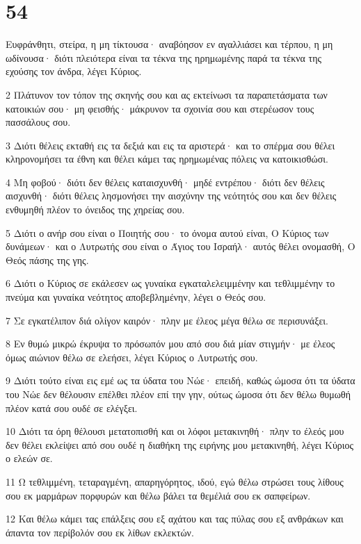 \chapter{54}

\par Ευφράνθητι, στείρα, η μη τίκτουσα· αναβόησον εν αγαλλιάσει και τέρπου, η μη ωδίνουσα· διότι πλειότερα είναι τα τέκνα της ηρημωμένης παρά τα τέκνα της εχούσης τον άνδρα, λέγει Κύριος.
\par 2 Πλάτυνον τον τόπον της σκηνής σου και ας εκτείνωσι τα παραπετάσματα των κατοικιών σου· μη φεισθής· μάκρυνον τα σχοινία σου και στερέωσον τους πασσάλους σου.
\par 3 Διότι θέλεις εκταθή εις τα δεξιά και εις τα αριστερά· και το σπέρμα σου θέλει κληρονομήσει τα έθνη και θέλει κάμει τας ηρημωμένας πόλεις να κατοικισθώσι.
\par 4 Μη φοβού· διότι δεν θέλεις καταισχυνθή· μηδέ εντρέπου· διότι δεν θέλεις αισχυνθή· διότι θέλεις λησμονήσει την αισχύνην της νεότητός σου και δεν θέλεις ενθυμηθή πλέον το όνειδος της χηρείας σου.
\par 5 Διότι ο ανήρ σου είναι ο Ποιητής σου· το όνομα αυτού είναι, Ο Κύριος των δυνάμεων· και ο Λυτρωτής σου είναι ο Άγιος του Ισραήλ· αυτός θέλει ονομασθή, Ο Θεός πάσης της γης.
\par 6 Διότι ο Κύριος σε εκάλεσεν ως γυναίκα εγκαταλελειμμένην και τεθλιμμένην το πνεύμα και γυναίκα νεότητος αποβεβλημένην, λέγει ο Θεός σου.
\par 7 Σε εγκατέλιπον διά ολίγον καιρόν· πλην με έλεος μέγα θέλω σε περισυνάξει.
\par 8 Εν θυμώ μικρώ έκρυψα το πρόσωπόν μου από σου διά μίαν στιγμήν· με έλεος όμως αιώνιον θέλω σε ελεήσει, λέγει Κύριος ο Λυτρωτής σου.
\par 9 Διότι τούτο είναι εις εμέ ως τα ύδατα του Νώε· επειδή, καθώς ώμοσα ότι τα ύδατα του Νώε δεν θέλουσιν επέλθει πλέον επί την γην, ούτως ώμοσα ότι δεν θέλω θυμωθή πλέον κατά σου ουδέ σε ελέγξει.
\par 10 Διότι τα όρη θέλουσι μετατοπισθή και οι λόφοι μετακινηθή· πλην το έλεός μου δεν θέλει εκλείψει από σου ουδέ η διαθήκη της ειρήνης μου μετακινηθή, λέγει Κύριος ο ελεών σε.
\par 11 Ω τεθλιμμένη, τεταραγμένη, απαρηγόρητος, ιδού, εγώ θέλω στρώσει τους λίθους σου εκ μαρμάρων πορφυρών και θέλω βάλει τα θεμέλιά σου εκ σαπφείρων.
\par 12 Και θέλω κάμει τας επάλξεις σου εξ αχάτου και τας πύλας σου εξ ανθράκων και άπαντα τον περίβολόν σου εκ λίθων εκλεκτών.
